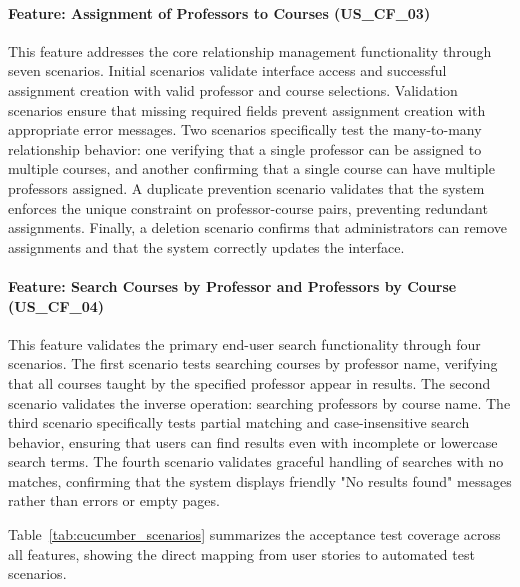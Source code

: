 \documentclass[12pt,a4paper]{article}
\begin{document}
\paragraph{Feature: Assignment of Professors to Courses (US\_CF\_03)}

This feature addresses the core relationship management functionality through seven scenarios. Initial scenarios validate interface access and successful assignment creation with valid professor and course selections. Validation scenarios ensure that missing required fields prevent assignment creation with appropriate error messages. Two scenarios specifically test the many-to-many relationship behavior: one verifying that a single professor can be assigned to multiple courses, and another confirming that a single course can have multiple professors assigned. A duplicate prevention scenario validates that the system enforces the unique constraint on professor-course pairs, preventing redundant assignments. Finally, a deletion scenario confirms that administrators can remove assignments and that the system correctly updates the interface.\newline

\paragraph{Feature: Search Courses by Professor and Professors by Course (US\_CF\_04)}

This feature validates the primary end-user search functionality through four scenarios. The first scenario tests searching courses by professor name, verifying that all courses taught by the specified professor appear in results. The second scenario validates the inverse operation: searching professors by course name. The third scenario specifically tests partial matching and case-insensitive search behavior, ensuring that users can find results even with incomplete or lowercase search terms. The fourth scenario validates graceful handling of searches with no matches, confirming that the system displays friendly "No results found" messages rather than errors or empty pages.\newline

Table~\ref{tab:cucumber_scenarios} summarizes the acceptance test coverage across all features, showing the direct mapping from user stories to automated test scenarios.\newline
\end{document}
